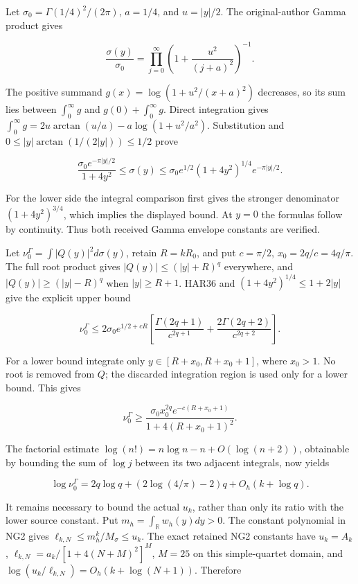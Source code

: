 \documentclass[11pt]{article}
\begin{document}
Let \(\sigma_0=\Gamma(1/4)^2/(2\pi)\), \(a=1/4\), and \(u=|y|/2\). The original-author Gamma product gives

\[
\frac{\sigma(y)}{\sigma_0}=
\prod_{j=0}^\infty\left(1+\frac{u^2}{(j+a)^2}\right)^{-1}.
\]

The positive summand \(g(x)=\log(1+u^2/(x+a)^2)\) decreases, so its sum lies between \(\int_0^\infty g\) and \(g(0)+\int_0^\infty g\). Direct integration gives \(\int_0^\infty g=2u\arctan(u/a)-a\log(1+u^2/a^2)\). Substitution and \(0\le |y|\arctan(1/(2|y|))\le1/2\) prove

\[
\frac{\sigma_0e^{-\pi|y|/2}}{1+4y^2}
\le\sigma(y)
\le\sigma_0 e^{1/2}(1+4y^2)^{1/4}e^{-\pi|y|/2}.
\tag{HAR36}
\]

For the lower side the integral comparison first gives the stronger denominator \((1+4y^2)^{3/4}\), which implies the displayed bound. At \(y=0\) the formulas follow by continuity. Thus both received Gamma envelope constants are verified.

Let \(\nu_0^\Gamma=\int|Q(y)|^2d\sigma(y)\), retain \(R=kR_0\), and put \(c=\pi/2\), \(x_0=2q/c=4q/\pi\). The full root product gives \(|Q(y)|\le(|y|+R)^q\) everywhere, and \(|Q(y)|\ge(|y|-R)^q\) when \(|y|\ge R+1\). HAR36 and \((1+4y^2)^{1/4}\le1+2|y|\) give the explicit upper bound

\[
\nu_0^\Gamma\le
2\sigma_0e^{1/2+cR}
\left[\frac{\Gamma(2q+1)}{c^{2q+1}}
+\frac{2\Gamma(2q+2)}{c^{2q+2}}\right].
\tag{HAR37}
\]

For a lower bound integrate only \(y\in[R+x_0,R+x_0+1]\), where \(x_0>1\). No root is removed from \(Q\); the discarded integration region is used only for a lower bound. This gives

\[
\nu_0^\Gamma\ge
\frac{\sigma_0 x_0^{2q}e^{-c(R+x_0+1)}}
{1+4(R+x_0+1)^2}.
\tag{HAR38}
\]

The factorial estimate \(\log(n!)=n\log n-n+O(\log(n+2))\), obtainable by bounding the sum of \(\log j\) between its two adjacent integrals, now yields

\[
\log\nu_0^\Gamma
=2q\log q+(2\log(4/\pi)-2)q+O_h(k+\log q).
\tag{HAR39}
\]

It remains necessary to bound the actual \(u_k\), rather than only its ratio with the lower source constant. Put \(m_h=\int_{\mathbb R}w_h(y)dy>0\). The constant polynomial in NG2 gives \(\ell_{k,N}\le m_h^k/M_\sigma\le u_k\). The exact retained NG2 constants have \(u_k=A_k\), \(\ell_{k,N}=a_k/[1+4(N+M)^2]^M\), \(M=25\) on this simple-quartet domain, and \(\log(u_k/\ell_{k,N})=O_h(k+\log(N+1))\). Therefore
\end{document}
